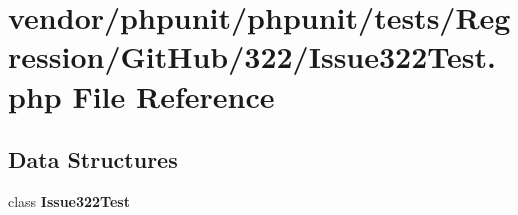 \section{vendor/phpunit/phpunit/tests/\+Regression/\+Git\+Hub/322/\+Issue322\+Test.php File Reference}
\label{_issue322_test_8php}
\subsection*{Data Structures}
\begin{DoxyCompactItemize}
\item 
class {\bf Issue322\+Test}
\end{DoxyCompactItemize}
